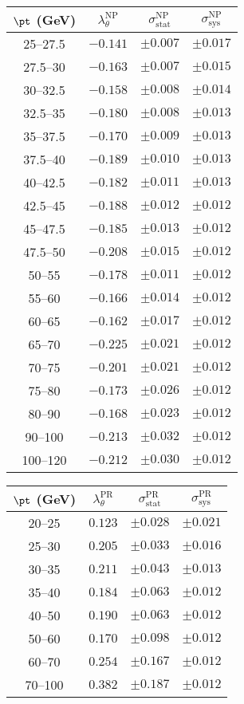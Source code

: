 \begin{tabular}{c||c||c|c}
$\pt$ (GeV) & $\lambda_\theta^{\text{NP}}$ & $\sigma_{\text{stat}}^{\text{NP}}$ & $\sigma_{\text{sys}}^{\text{NP}}$  \\
\hline
25--27.5 & $-0.141$ & $\pm0.007$ & $\pm0.017$\\
27.5--30 & $-0.163$ & $\pm0.007$ & $\pm0.015$\\
30--32.5 & $-0.158$ & $\pm0.008$ & $\pm0.014$\\
32.5--35 & $-0.180$ & $\pm0.008$ & $\pm0.013$\\
35--37.5 & $-0.170$ & $\pm0.009$ & $\pm0.013$\\
37.5--40 & $-0.189$ & $\pm0.010$ & $\pm0.013$\\
40--42.5 & $-0.182$ & $\pm0.011$ & $\pm0.013$\\
42.5--45 & $-0.188$ & $\pm0.012$ & $\pm0.012$\\
45--47.5 & $-0.185$ & $\pm0.013$ & $\pm0.012$\\
47.5--50 & $-0.208$ & $\pm0.015$ & $\pm0.012$\\
50--55 & $-0.178$ & $\pm0.011$ & $\pm0.012$\\
55--60 & $-0.166$ & $\pm0.014$ & $\pm0.012$\\
60--65 & $-0.162$ & $\pm0.017$ & $\pm0.012$\\
65--70 & $-0.225$ & $\pm0.021$ & $\pm0.012$\\
70--75 & $-0.201$ & $\pm0.021$ & $\pm0.012$\\
75--80 & $-0.173$ & $\pm0.026$ & $\pm0.012$\\
80--90 & $-0.168$ & $\pm0.023$ & $\pm0.012$\\
90--100 & $-0.213$ & $\pm0.032$ & $\pm0.012$\\
100--120 & $-0.212$ & $\pm0.030$ & $\pm0.012$
\end{tabular}

\begin{tabular}{c||c||c|c}
$\pt$ (GeV) & $\lambda_\theta^{\text{PR}}$ & $\sigma_{\text{stat}}^{\text{PR}}$ & $\sigma_{\text{sys}}^{\text{PR}}$  \\
\hline
20--25 & $0.123$ & $\pm0.028$ & $\pm0.021$\\
25--30 & $0.205$ & $\pm0.033$ & $\pm0.016$\\
30--35 & $0.211$ & $\pm0.043$ & $\pm0.013$\\
35--40 & $0.184$ & $\pm0.063$ & $\pm0.012$\\
40--50 & $0.190$ & $\pm0.063$ & $\pm0.012$\\
50--60 & $0.170$ & $\pm0.098$ & $\pm0.012$\\
60--70 & $0.254$ & $\pm0.167$ & $\pm0.012$\\
70--100 & $0.382$ & $\pm0.187$ & $\pm0.012$
\end{tabular}

